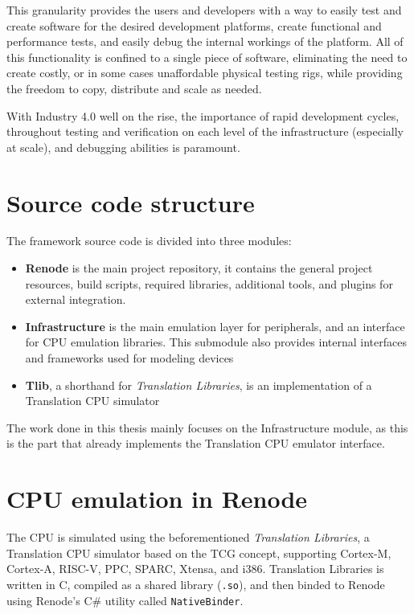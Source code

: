 \noindent
This granularity provides the users and developers with a way to easily test and create software for the desired
development platforms, create functional and performance tests, and easily debug the internal workings of the platform.
All of this functionality is confined to a single piece of software, eliminating the need to create costly, or in some
cases unaffordable physical testing rigs, while providing the freedom to copy, distribute and scale as needed.

With Industry 4.0 well on the rise, the importance of rapid development cycles, throughout testing and verification
on each level of the infrastructure (especially at scale), and debugging abilities is paramount.

\section*{Source code structure}
The framework source code \cite{Renode} is divided into three modules:

\begin{itemize}
    \item{\textbf{Renode} is the main project repository, it contains the general project resources, build
    scripts, required libraries, additional tools, and plugins for external integration.}
    \item{\textbf{Infrastructure} is the main emulation layer for peripherals, and an interface for CPU emulation
    libraries. This submodule also provides internal interfaces and frameworks used for modeling devices}
    \item{\textbf{Tlib}, a shorthand for \textit{Translation Libraries}, is an implementation of a Translation CPU
    simulator}
\end{itemize}

\noindent
The work done in this thesis mainly focuses on the Infrastructure module, as this is the part that already implements
the Translation CPU emulator interface.

\section*{CPU emulation in Renode}

The CPU is simulated using the beforementioned \textit{Translation Libraries}, a Translation CPU simulator
based on the TCG concept, supporting Cortex-M, Cortex-A, RISC-V, PPC, SPARC, Xtensa, and i386.
Translation Libraries is written in C, compiled as a shared library (\texttt{.so}), and then binded to Renode using
Renode's C\# utility called \texttt{NativeBinder}.

